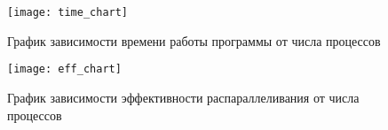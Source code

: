 \documentclass[oneside,final,14pt]{extreport}
\begin{document}
\begin{figure}[hp]
    \centering
    \texttt{[image: time\_chart]}
    \caption{График зависимости времени работы программы от числа процессов}
    \label{time_fig}
\end{figure}

\begin{figure}[hp]
    \centering
    \texttt{[image: eff\_chart]}
    \caption{График зависимости эффективности распараллеливания от числа процессов}
    \label{eff_fig}
\end{figure}
\end{document}
